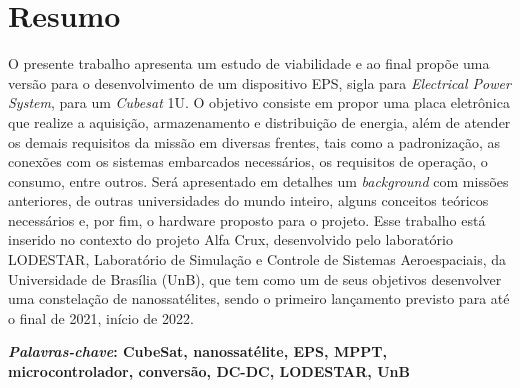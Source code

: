 \chapter*{Resumo}
O presente trabalho apresenta um estudo de viabilidade e ao final propõe uma versão para o desenvolvimento de um dispositivo EPS, sigla para \textit{Electrical Power System}, para um \textit{Cubesat} 1U. O objetivo consiste em propor uma placa eletrônica que realize a aquisição, armazenamento e distribuição de energia, além de atender os demais requisitos da missão em diversas frentes, tais como a padronização, as conexões com os sistemas embarcados necessários, os requisitos de operação, o consumo, entre outros. Será apresentado em detalhes um \textit{background} com missões anteriores, de outras universidades do mundo inteiro, alguns conceitos teóricos necessários e, por fim, o hardware proposto para o projeto. Esse trabalho está inserido no contexto do projeto Alfa Crux, desenvolvido pelo laboratório LODESTAR, Laboratório de Simulação e Controle de Sistemas Aeroespaciais, da Universidade de Brasília (UnB), que tem como um de seus objetivos desenvolver uma constelação de nanossatélites, sendo o primeiro lançamento previsto para até o final de 2021, início de 2022. 

\textbf{\textit{Palavras-chave}: CubeSat, nanossatélite, EPS, MPPT, microcontrolador, conversão, DC-DC, LODESTAR, UnB}
